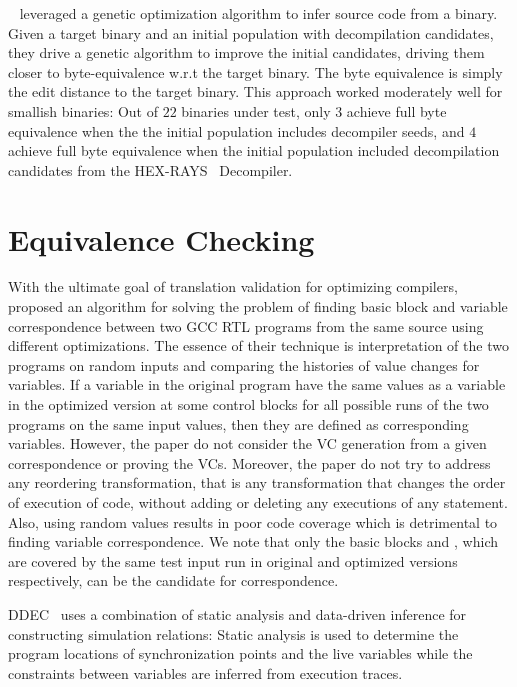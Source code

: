 ~\cite{eschulte2018bed} leveraged a genetic optimization algorithm to infer
source code from a binary. Given a target binary and an initial population with
decompilation candidates, they  drive a genetic algorithm to improve the
initial candidates, driving them closer to byte-equivalence w.r.t the target
binary. The byte equivalence  is simply the edit distance to the target binary.
This approach worked moderately well for smallish binaries: Out of $22$
binaries under test, only $3$ achieve full byte equivalence when the the
initial population includes decompiler seeds, and $4$ achieve full byte
equivalence when the initial population included decompilation candidates  from
the HEX-RAYS~\cite{hexray} Decompiler. 

\section{Equivalence Checking}

With the ultimate goal of translation validation for optimizing compilers,
     ~\cite{Iman2005} proposed an algorithm for solving the problem of finding
     basic block and variable correspondence between two GCC RTL programs from
     the same source using different optimizations.  The essence of their
     technique is interpretation of the two programs on random inputs and
     comparing the histories of value changes for variables. If a variable
      in the original program have the same values as a variable 
     in the optimized version at some control blocks for all possible runs of
     the two programs on the same input values, then they are defined as
     corresponding variables. However, the paper do not consider the VC
     generation from a given correspondence or proving the VCs. Moreover, the
     paper do not try to address any reordering transformation, that is any
     transformation that changes the order of execution of code, without adding
     or deleting any executions of any statement. Also, using random values
     results in poor code coverage which is detrimental to finding variable
     correspondence. We note that only the basic blocks  and ,
     which are covered by the same test input run in original and optimized
     versions respectively, can be the candidate for correspondence.     

DDEC~\cite{DDEC:OOPSLA:2013} uses a combination of static analysis and
data-driven inference for constructing simulation relations: Static analysis is
used to determine the program locations of synchronization points and the live
variables while the constraints between variables are inferred from execution
traces.

